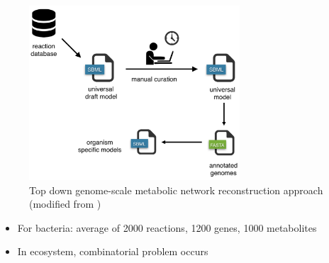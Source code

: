 \documentclass[8pt]{beamer}
\begin{document}
\begin{frame}
\begin{minipage}{0.3\textwidth}
\end{minipage}%
\begin{minipage}{0.7\textwidth}
\begin{figure}
\includegraphics[width=0.7\textwidth]{figures/top-down}
\caption{Top down genome-scale metabolic network reconstruction approach \tiny (modified from \cite{Machado2018})}
\end{figure}
\end{minipage}
\vspace{-0.4cm}
\begin{block}{}
\begin{itemize}
\item For bacteria: average of 2000 reactions, 1200 genes, 1000 metabolites
\item In ecosystem, combinatorial problem occurs
\end{itemize}
\end{block}
\end{frame}
\end{document}
